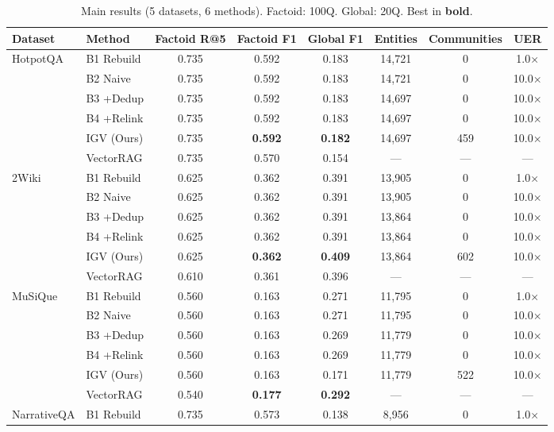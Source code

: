 \documentclass[sigconf,anonymous,review]{acmart}
\begin{document}
\begin{table}[t]
\centering
\caption{Main results (5 datasets, 6 methods). Factoid: 100Q. Global: 20Q. Best in \textbf{bold}.}
\label{tab:main}
\small
\begin{tabular}{llcccccc}
\toprule
Dataset & Method & Factoid R@5 & Factoid F1 & Global F1 & Entities & Communities & UER \\
\midrule
\multirow{6}{*}{HotpotQA} & B1 Rebuild & 0.735 & 0.592 & 0.183 & 14,721 & 0 & 1.0$\times$ \\
 & B2 Naive & 0.735 & 0.592 & 0.183 & 14,721 & 0 & 10.0$\times$ \\
 & B3 +Dedup & 0.735 & 0.592 & 0.183 & 14,697 & 0 & 10.0$\times$ \\
 & B4 +Relink & 0.735 & 0.592 & 0.183 & 14,697 & 0 & 10.0$\times$ \\
 & IGV (Ours) & 0.735 & \textbf{0.592} & \textbf{0.182} & 14,697 & 459 & 10.0$\times$ \\
 & VectorRAG & 0.735 & 0.570 & 0.154 & --- & --- & --- \\
\midrule
\multirow{6}{*}{2Wiki} & B1 Rebuild & 0.625 & 0.362 & 0.391 & 13,905 & 0 & 1.0$\times$ \\
 & B2 Naive & 0.625 & 0.362 & 0.391 & 13,905 & 0 & 10.0$\times$ \\
 & B3 +Dedup & 0.625 & 0.362 & 0.391 & 13,864 & 0 & 10.0$\times$ \\
 & B4 +Relink & 0.625 & 0.362 & 0.391 & 13,864 & 0 & 10.0$\times$ \\
 & IGV (Ours) & 0.625 & \textbf{0.362} & \textbf{0.409} & 13,864 & 602 & 10.0$\times$ \\
 & VectorRAG & 0.610 & 0.361 & 0.396 & --- & --- & --- \\
\midrule
\multirow{6}{*}{MuSiQue} & B1 Rebuild & 0.560 & 0.163 & 0.271 & 11,795 & 0 & 1.0$\times$ \\
 & B2 Naive & 0.560 & 0.163 & 0.271 & 11,795 & 0 & 10.0$\times$ \\
 & B3 +Dedup & 0.560 & 0.163 & 0.269 & 11,779 & 0 & 10.0$\times$ \\
 & B4 +Relink & 0.560 & 0.163 & 0.269 & 11,779 & 0 & 10.0$\times$ \\
 & IGV (Ours) & 0.560 & 0.163 & 0.171 & 11,779 & 522 & 10.0$\times$ \\
 & VectorRAG & 0.540 & \textbf{0.177} & \textbf{0.292} & --- & --- & --- \\
\midrule
\multirow{6}{*}{NarrativeQA} & B1 Rebuild & 0.735 & 0.573 & 0.138 & 8,956 & 0 & 1.0$\times$ \\

\end{tabular}
\end{table}
\end{document}
